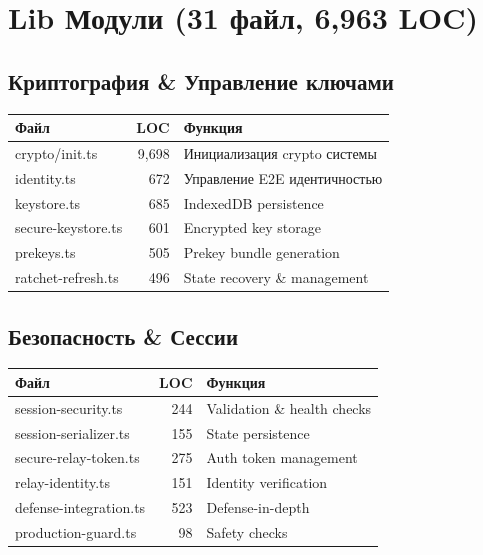 \documentclass[11pt,a4paper,oneside]{book}
\begin{document}
\vspace{-0.3cm}\section{Lib Модули (31 файл, 6,963 LOC)}
\vspace{-0.2cm}\subsection{Криптография \& Управление ключами}
\begin{table}[h]
\centering
\begin{tabular}{|l|r|l|}
\hline
\textbf{Файл} & \textbf{LOC} & \textbf{Функция} \\
\hline
crypto/init.ts & 9,698 & Инициализация crypto системы \\
\hline
identity.ts & 672 & Управление E2E идентичностью \\
\hline
keystore.ts & 685 & IndexedDB persistence \\
\hline
secure-keystore.ts & 601 & Encrypted key storage \\
\hline
prekeys.ts & 505 & Prekey bundle generation \\
\hline
ratchet-refresh.ts & 496 & State recovery \& management \\
\hline
\end{tabular}
\end{table}
\vspace{-0.2cm}\subsection{Безопасность \& Сессии}
\begin{table}[h]
\centering
\begin{tabular}{|l|r|l|}
\hline
\textbf{Файл} & \textbf{LOC} & \textbf{Функция} \\
\hline
session-security.ts & 244 & Validation \& health checks \\
\hline
session-serializer.ts & 155 & State persistence \\
\hline
secure-relay-token.ts & 275 & Auth token management \\
\hline
relay-identity.ts & 151 & Identity verification \\
\hline
defense-integration.ts & 523 & Defense-in-depth \\
\hline
production-guard.ts & 98 & Safety checks \\
\hline
\end{tabular}
\end{table}
\end{document}
